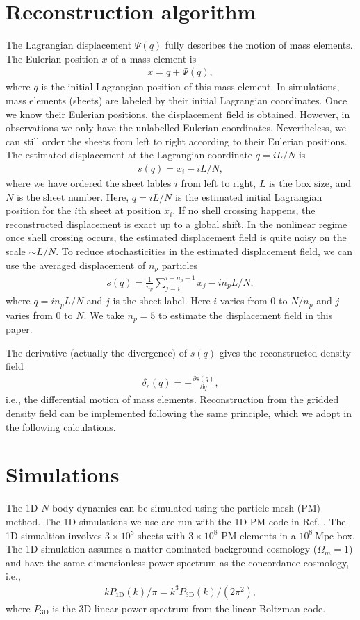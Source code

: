 \documentclass[aps,prd,twocolumn,showpacs,superscriptaddress,groupedaddress,nofootinbib]{revtex4}  %
\newcommand{\mr}{\mathrm}
\newcommand{\bea}{\begin{eqnarray}}
\newcommand{\eea}{\end{eqnarray}}
\begin{document}
\section{Reconstruction algorithm}
\label{rec}
The Lagrangian displacement 
${\Psi}({q})$ fully describes the motion of mass elements.
The Eulerian position ${x}$ of a mass element is
\bea
{x}={q}+{\Psi}({q}),
\eea
where ${q}$ is the initial Lagrangian position of this mass element.
In simulations, mass elements (sheets) are labeled by their initial 
Lagrangian coordinates. Once we know their Eulerian positions, the displacement 
field is obtained. However, in observations we only have the unlabelled 
Eulerian coordinates. 
Nevertheless, we can still order the sheets from left to right according to their
Eulerian positions.
The estimated displacement at the Lagrangian coordinate $q=iL/N$ is 
\bea
s(q)=x_i-iL/N,
\eea
where we have ordered the sheet lables $i$ from left to right, $L$ is the box
size, and $N$ is the sheet number. 
Here, $q=iL/N$ is the estimated initial Lagrangian position for the $i$th sheet
at position $x_i$.
If no shell crossing happens, the reconstructed displacement is exact up to
a global shift. In the nonlinear regime once shell crossing occurs, the 
estimated displacement field is quite noisy on the scale $\sim L/N$.
To reduce stochasticities in the estimated displacement field, we can use the
averaged displacement of $n_p$ particles 
\bea
s(q)=\frac{1}{n_p}\sum_{j=i}^{i+n_p-1}x_{j}-in_pL/N,
\eea
where $q=in_pL/N$ and $j$ is the sheet label. 
Here $i$ varies from $0$ to $N/n_p$ and $j$ varies from $0$ to $N$.
We take $n_p=5$ to estimate the displacement field in this paper.

The derivative (actually the divergence) of $s(q)$ gives the reconstructed 
density field 
\bea
\delta_r({q})=-\frac{\partial s(q)}{\partial q},
\eea
i.e., the differential motion of mass elements. 
Reconstruction from the gridded density field can be implemented following
the same principle, which we adopt in the following calculations.

\section{Simulations}
\label{sim}
The 1D $N$-body dynamics can be simulated using the particle-mesh (PM) method.
The 1D simulations we use are run with the 1D PM code in Ref. \cite{2016matt}.
The 1D simualtion involves $3\times10^8$ sheets with $3\times10^8$ PM elements 
in a $10^8\ \mr{Mpc}$ box. The 1D simulation assumes a matter-dominated 
background cosmology ($\Omega_m=1$) and have the same dimensionless power 
spectrum as the concordance cosmology, i.e., 
\bea
kP_\mr{1D}(k)/\pi=k^3P_\mr{3D}(k)/(2\pi^2),
\eea
where $P_\mr{3D}$ is the 3D linear power spectrum from the linear Boltzman code.
\end{document}
